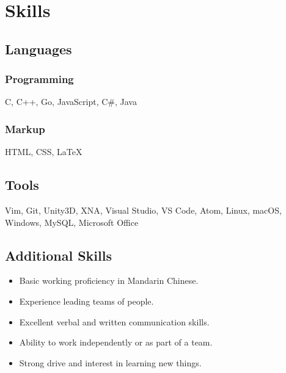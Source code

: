 \documentclass[letterpaper, 10pt]{article}
\begin{document}
\vspace{-0.5em}

\section{Skills}

\subsection{Languages}
\vspace{-1em}
\begin{multicols}{2}
\subsubsection{Programming}

C, C++, Go, JavaScript, C\#, Java

\subsubsection{Markup}

HTML, CSS, {\LaTeX}
\end{multicols}
\vspace{-0.5em}

\subsection{Tools}

Vim, Git, Unity3D, XNA, Visual Studio, VS Code, Atom, Linux, macOS, Windows, MySQL, Microsoft Office

\vspace{0.5em}
\subsection{Additional Skills}
\vspace{-1.25em}
\begin{multicols}{2}
\begin{itemize}[nolistsep]
\item Basic working proficiency in Mandarin Chinese.
\item Experience leading teams of people.
\item Excellent verbal and written communication skills.
\item Ability to work independently or as part of a team.
\item Strong drive and interest in learning new things.
\end{itemize}
\end{multicols}
\end{document}
